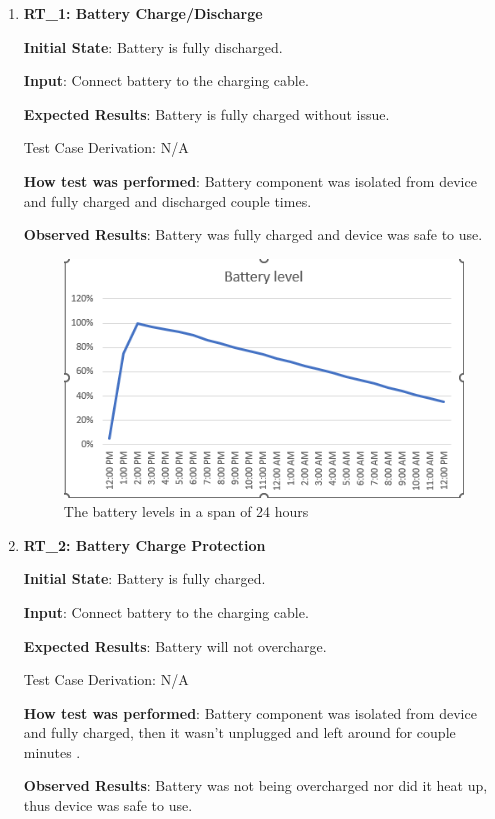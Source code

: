 \documentclass[12pt, titlepage]{article}
\begin{document}
\begin{enumerate}


  \item{\textbf{RT\_1: Battery Charge/Discharge}}\label{RT1}

  \textbf{Initial State}: Battery is fully discharged.

  \textbf{Input}: Connect battery to the charging cable.

  \textbf{Expected Results}: Battery is fully charged without issue.

  Test Case Derivation: N/A

  \textbf{How test was performed}: Battery component was isolated from device and fully charged and discharged couple times.

  \textbf{Observed Results}: Battery was fully charged and device was safe to use.\\
\begin{figure}
\centering
  \includegraphics{battery_level}
	\caption{The battery levels in a span of 24 hours}
\label{fig:battery_level}
\end{figure}
  \item{\textbf{RT\_2: Battery Charge Protection}}\label{RT2}

  \textbf{Initial State}: Battery is fully charged.

  \textbf{Input}: Connect battery to the charging cable.

  \textbf{Expected Results}: Battery will not overcharge.

  Test Case Derivation: N/A

  \textbf{How test was performed}: Battery component was isolated from device and fully charged, then it wasn't unplugged and left around for couple minutes .

  \textbf{Observed Results}: Battery was not being overcharged nor did it heat up, thus device was safe to use.

\end{enumerate}
\end{document}
